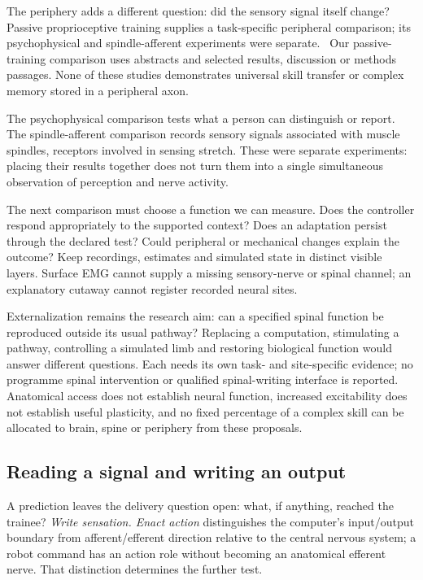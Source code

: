 The periphery adds a different question: did the sensory signal itself change?
Passive proprioceptive training supplies a task-specific peripheral comparison;
its psychophysical and spindle-afferent experiments were separate.~\cite{ackerley2022retained}
Our passive-training comparison uses abstracts and selected results, discussion
or methods passages. None of these studies demonstrates universal skill
transfer or complex memory stored in a peripheral axon.

The psychophysical comparison tests what a person can distinguish or report.
The spindle-afferent comparison records sensory signals associated with
muscle spindles, receptors involved in sensing stretch. These were separate
experiments: placing their results together does not turn them into a single
simultaneous observation of perception and nerve activity.

The next comparison must choose a function we can measure. Does the controller
respond appropriately to the supported context? Does an adaptation persist
through the declared test? Could peripheral or mechanical changes explain the
outcome? Keep recordings, estimates and simulated state in distinct visible
layers. Surface EMG cannot supply a missing sensory-nerve or spinal channel;
an explanatory cutaway cannot register recorded neural sites.

Externalization remains the research aim: can a specified spinal function be
reproduced outside its usual pathway? Replacing a computation, stimulating a
pathway, controlling a simulated limb and restoring biological function would
answer different questions. Each needs its own task- and site-specific evidence;
no programme spinal intervention or qualified spinal-writing interface is reported. Anatomical access does not establish
neural function, increased excitability does not establish useful plasticity,
and no fixed percentage of a complex skill can be allocated to brain, spine
or periphery from these proposals.

\subsection{Reading a signal and writing an output}

A prediction leaves the delivery question open: what, if anything, reached
the trainee? \emph{Write sensation. Enact action} distinguishes the computer's
input/output boundary from afferent/efferent direction relative to the central
nervous system; a robot command has an action role without becoming an
anatomical efferent nerve. That distinction determines the further test.

